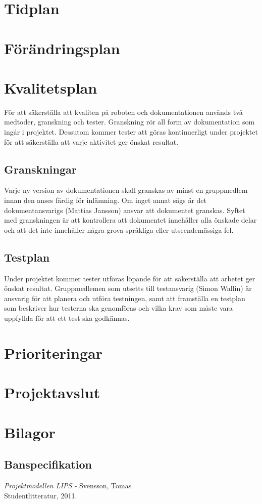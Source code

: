 \documentclass[a4paper,12pt]{article}
\begin{document}
\section{Tidplan}

\section{Förändringsplan}	%

\section{Kvalitetsplan}	%
För att säkerställa att kvaliten på roboten och dokumentationen används två medtoder, granskning och tester. Granskning rör all form av dokumentation som ingår i projektet. Dessutom kommer tester att göras kontinuerligt under projektet för att säkerställa att varje aktivitet ger önskat resultat.
\subsection{Granskningar}
Varje ny version av dokumentationen skall granskas av minst en gruppmedlem innan den anses färdig för inlämning. Om inget annat sägs är det dokumentansvarigs (Mattias Jansson) ansvar att dokumentet granskas. Syftet med granskningen är att kontrollera att dokumentet innehåller alla önskade delar och att det inte innehåller några grova språkliga eller utseendemässiga fel.
\subsection{Testplan}
Under projektet kommer tester utföras löpande för att säkerställa att arbetet ger önskat resultat. Gruppmedlemen som utsetts till testansvarig (Simon Wallin) är ansvarig för att planera och utföra testningen, samt att framställa en testplan som beskriver hur testerna ska genomföras och vilka krav som måste vara uppfyllda för att ett test ska godkännas.



\section{Prioriteringar}


\section{Projektavslut} %


\newpage
\appendix
\section{Bilagor} \label{app:rules}


\subsection{Banspecifikation} \label{app:bana}

\newpage


\begin{thebibliography}{99}
\textit{Projektmodellen LIPS - } Svensson, Tomas
\\Studentlitteratur, 2011.
\end{thebibliography}
\end{document}

